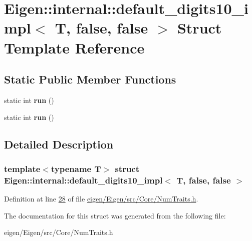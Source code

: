 \hypertarget{struct_eigen_1_1internal_1_1default__digits10__impl_3_01_t_00_01false_00_01false_01_4}{}\section{Eigen\+:\+:internal\+:\+:default\+\_\+digits10\+\_\+impl$<$ T, false, false $>$ Struct Template Reference}
\label{struct_eigen_1_1internal_1_1default__digits10__impl_3_01_t_00_01false_00_01false_01_4}
\subsection*{Static Public Member Functions}
\begin{DoxyCompactItemize}
\item 
\mbox{\label{struct_eigen_1_1internal_1_1default__digits10__impl_3_01_t_00_01false_00_01false_01_4_a521064304069c0b00be0bf9b6ee855a8}} 
static int {\bfseries run} ()
\item 
\mbox{\label{struct_eigen_1_1internal_1_1default__digits10__impl_3_01_t_00_01false_00_01false_01_4_a521064304069c0b00be0bf9b6ee855a8}} 
static int {\bfseries run} ()
\end{DoxyCompactItemize}


\subsection{Detailed Description}
\subsubsection*{template$<$typename T$>$\newline
struct Eigen\+::internal\+::default\+\_\+digits10\+\_\+impl$<$ T, false, false $>$}



Definition at line \hyperlink{eigen_2_eigen_2src_2_core_2_num_traits_8h_source_l00028}{28} of file \hyperlink{eigen_2_eigen_2src_2_core_2_num_traits_8h_source}{eigen/\+Eigen/src/\+Core/\+Num\+Traits.\+h}.



The documentation for this struct was generated from the following file\+:\begin{DoxyCompactItemize}
\item 
eigen/\+Eigen/src/\+Core/\+Num\+Traits.\+h\end{DoxyCompactItemize}
